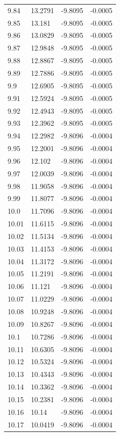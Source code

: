 \begin{tabular}{llll}
9.84 & 13.2791 & -9.8095 & -0.0005 \\
9.85 & 13.181 & -9.8095 & -0.0005 \\
9.86 & 13.0829 & -9.8095 & -0.0005 \\
9.87 & 12.9848 & -9.8095 & -0.0005 \\
9.88 & 12.8867 & -9.8095 & -0.0005 \\
9.89 & 12.7886 & -9.8095 & -0.0005 \\
9.9 & 12.6905 & -9.8095 & -0.0005 \\
9.91 & 12.5924 & -9.8095 & -0.0005 \\
9.92 & 12.4943 & -9.8095 & -0.0005 \\
9.93 & 12.3962 & -9.8095 & -0.0005 \\
9.94 & 12.2982 & -9.8096 & -0.0004 \\
9.95 & 12.2001 & -9.8096 & -0.0004 \\
9.96 & 12.102 & -9.8096 & -0.0004 \\
9.97 & 12.0039 & -9.8096 & -0.0004 \\
9.98 & 11.9058 & -9.8096 & -0.0004 \\
9.99 & 11.8077 & -9.8096 & -0.0004 \\
10.0 & 11.7096 & -9.8096 & -0.0004 \\
10.01 & 11.6115 & -9.8096 & -0.0004 \\
10.02 & 11.5134 & -9.8096 & -0.0004 \\
10.03 & 11.4153 & -9.8096 & -0.0004 \\
10.04 & 11.3172 & -9.8096 & -0.0004 \\
10.05 & 11.2191 & -9.8096 & -0.0004 \\
10.06 & 11.121 & -9.8096 & -0.0004 \\
10.07 & 11.0229 & -9.8096 & -0.0004 \\
10.08 & 10.9248 & -9.8096 & -0.0004 \\
10.09 & 10.8267 & -9.8096 & -0.0004 \\
10.1 & 10.7286 & -9.8096 & -0.0004 \\
10.11 & 10.6305 & -9.8096 & -0.0004 \\
10.12 & 10.5324 & -9.8096 & -0.0004 \\
10.13 & 10.4343 & -9.8096 & -0.0004 \\
10.14 & 10.3362 & -9.8096 & -0.0004 \\
10.15 & 10.2381 & -9.8096 & -0.0004 \\
10.16 & 10.14 & -9.8096 & -0.0004 \\
10.17 & 10.0419 & -9.8096 & -0.0004 \\

\end{tabular}
